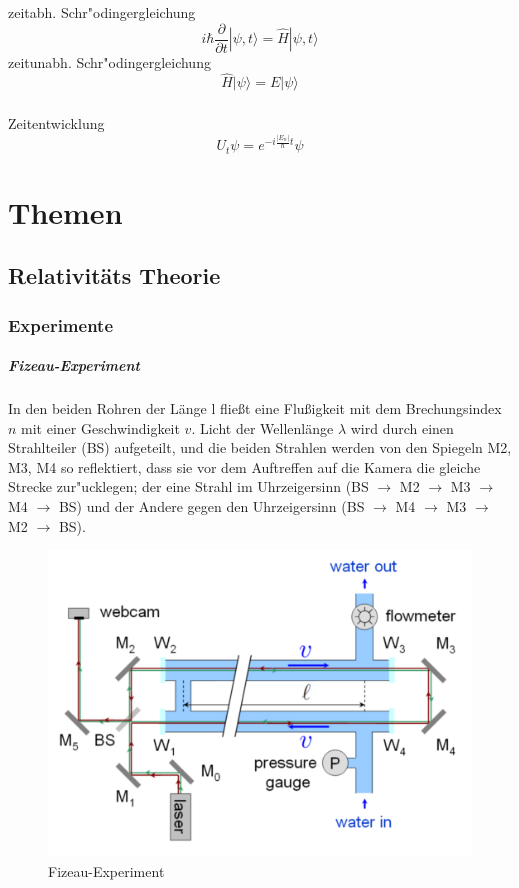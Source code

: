 \documentclass[12pt]{report}
\begin{document}
zeitabh. Schr"odingergleichung
\[i\hbar\frac{\partial}{\partial t}|\psi,t\rangle=\hat{H}|\psi,t\rangle\]
zeitunabh. Schr"odingergleichung
\[\hat{H}|\psi\rangle=E|\psi\rangle\]

\subsection{}

Zeitentwicklung
\[U_t\psi=e^{-i\frac{|E_n|}{\hbar}t}\psi\]

\chapter{Themen}

\section{Relativitäts Theorie}

\subsection{Experimente}
\paragraph{Fizeau-Experiment}

In den beiden Rohren der Länge l fließt eine Flußigkeit mit dem Brechungsindex $n$ mit einer Geschwindigkeit $v$. Licht der Wellenlänge $\lambda$ wird durch einen Strahlteiler (BS) aufgeteilt, und die beiden Strahlen werden von den Spiegeln M2, M3, M4 so reflektiert, dass sie vor dem Auftreffen auf die Kamera die gleiche Strecke zur"ucklegen; der eine Strahl im Uhrzeigersinn (BS $\to$ M2 $\to$ M3 $\to$ M4 $\to$ BS) und der Andere gegen den Uhrzeigersinn (BS $\to$ M4 $\to$ M3 $\to$ M2 $\to$ BS).

\begin{figure}
\centering
\includegraphics[width=.8\textwidth]{Fizz}
\caption{Fizeau-Experiment}
\label{fizz}
\end{figure}
\end{document}
